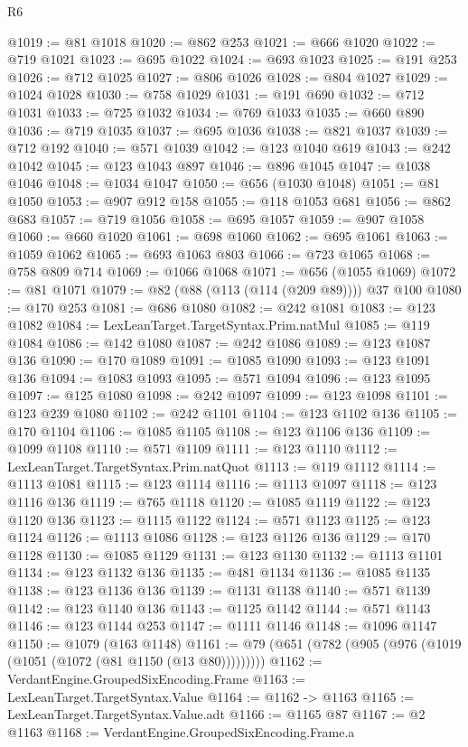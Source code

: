 \begin{lexlean}{R6}
\begin{coremodule}
@1019 := @81 @1018
@1020 := @862 @253
@1021 := @666 @1020
@1022 := @719 @1021
@1023 := @695 @1022
@1024 := @693 @1023
@1025 := @191 @253
@1026 := @712 @1025
@1027 := @806 @1026
@1028 := @804 @1027
@1029 := @1024 @1028
@1030 := @758 @1029
@1031 := @191 @690
@1032 := @712 @1031
@1033 := @725 @1032
@1034 := @769 @1033
@1035 := @660 @890
@1036 := @719 @1035
@1037 := @695 @1036
@1038 := @821 @1037
@1039 := @712 @192
@1040 := @571 @1039
@1042 := @123 @1040 @619
@1043 := @242 @1042
@1045 := @123 @1043 @897
@1046 := @896 @1045
@1047 := @1038 @1046
@1048 := @1034 @1047
@1050 := @656 (@1030 @1048)
@1051 := @81 @1050
@1053 := @907 @912 @158
@1055 := @118 @1053 @681
@1056 := @862 @683
@1057 := @719 @1056
@1058 := @695 @1057
@1059 := @907 @1058
@1060 := @660 @1020
@1061 := @698 @1060
@1062 := @695 @1061
@1063 := @1059 @1062
@1065 := @693 @1063 @803
@1066 := @723 @1065
@1068 := @758 @809 @714
@1069 := @1066 @1068
@1071 := @656 (@1055 @1069)
@1072 := @81 @1071
@1079 := @82 (@88 (@113 (@114 (@209 @89)))) @37 @100
@1080 := @170 @253
@1081 := @686 @1080
@1082 := @242 @1081
@1083 := @123 @1082
@1084 := LexLeanTarget.TargetSyntax.Prim.natMul
@1085 := @119 @1084
@1086 := @142 @1080
@1087 := @242 @1086
@1089 := @123 @1087 @136
@1090 := @170 @1089
@1091 := @1085 @1090
@1093 := @123 @1091 @136
@1094 := @1083 @1093
@1095 := @571 @1094
@1096 := @123 @1095
@1097 := @125 @1080
@1098 := @242 @1097
@1099 := @123 @1098
@1101 := @123 @239 @1080
@1102 := @242 @1101
@1104 := @123 @1102 @136
@1105 := @170 @1104
@1106 := @1085 @1105
@1108 := @123 @1106 @136
@1109 := @1099 @1108
@1110 := @571 @1109
@1111 := @123 @1110
@1112 := LexLeanTarget.TargetSyntax.Prim.natQuot
@1113 := @119 @1112
@1114 := @1113 @1081
@1115 := @123 @1114
@1116 := @1113 @1097
@1118 := @123 @1116 @136
@1119 := @765 @1118
@1120 := @1085 @1119
@1122 := @123 @1120 @136
@1123 := @1115 @1122
@1124 := @571 @1123
@1125 := @123 @1124
@1126 := @1113 @1086
@1128 := @123 @1126 @136
@1129 := @170 @1128
@1130 := @1085 @1129
@1131 := @123 @1130
@1132 := @1113 @1101
@1134 := @123 @1132 @136
@1135 := @481 @1134
@1136 := @1085 @1135
@1138 := @123 @1136 @136
@1139 := @1131 @1138
@1140 := @571 @1139
@1142 := @123 @1140 @136
@1143 := @1125 @1142
@1144 := @571 @1143
@1146 := @123 @1144 @253
@1147 := @1111 @1146
@1148 := @1096 @1147
@1150 := @1079 (@163 @1148)
@1161 := @79 (@651 (@782 (@905 (@976 (@1019 (@1051 (@1072 (@81 @1150 (@13 @80)))))))))
@1162 := VerdantEngine.GroupedSixEncoding.Frame
@1163 := LexLeanTarget.TargetSyntax.Value
@1164 := @1162 -> @1163
@1165 := LexLeanTarget.TargetSyntax.Value.adt
@1166 := @1165 @87
@1167 := @2 @1163
@1168 := VerdantEngine.GroupedSixEncoding.Frame.a

\end{coremodule}
\end{lexlean}

